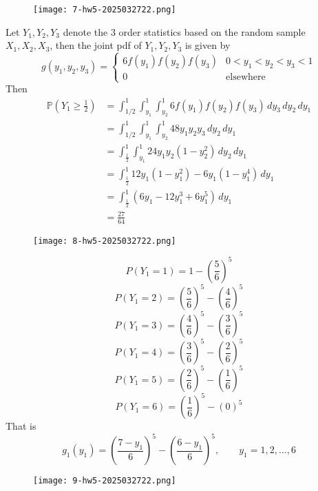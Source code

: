 \begin{exercise}
\begin{figure}[H]
\centering
\texttt{[image: 7-hw5-2025032722.png]}
\label{}
\end{figure}
\end{exercise}
Let $Y_1,Y_2,Y_3$ denote the 3 order statistics based on the random sample $X_1,X_2,X_3$, then the joint pdf of $Y_1,Y_2,Y_3$ is given by
\[
g(y_1,y_2,y_3)=\begin{cases}
6f(y_1)f(y_2)f(y_3) & 0<y_1<y_2<y_3<1 \\
0 & \text{elsewhere}
\end{cases}
\]
Then
\[
\begin{aligned}
\mathbb{P}\left( Y_1\geq \frac{1}{2} \right) & =\int_{1/2 }^{1} \int_{y_1}^{1} \int_{y_2}^{1} 6f(y_1)f(y_2)f(y_3) \, dy_3  \, dy_2  \, dy_1 \\
 & =\int_{1/2 }^{1} \int_{y_1}^{1} \int_{y_2}^{1} 48y_1y_2y_3  \, dy_2  \, dy_1  \\
 & =\int_{\frac{1}{2}}^{1} \int_{y_1}^{1} 24y_1y_2(1-y_2^2) \, dy_2  \, dy_1  \\
 & =\int_{\frac{1}{2}}^{1} 12y_1(1-y_1^2)-6y_1(1-y_1^{4}) \, dy_1 \\
  & =\int_{\frac{1}{2}}^{1} (6y_1-12y_1^3+6y_1^{5}) \, dy_1  \\
 & =\frac{27}{64} 
\end{aligned} 
\]
\begin{exercise}
\begin{figure}[H]
\centering
\texttt{[image: 8-hw5-2025032722.png]}
\label{}
\end{figure}
\end{exercise}
\[
P(Y_1=1)=1-\left( \frac{5}{6} \right)^{5}
\]
\[
P(Y_1=2)=\left( \frac{5}{6} \right)^{5}-\left( \frac{4}{6} \right)^{5}
\]
\[
P(Y_1=3)=\left( \frac{4}{6} \right)^{5}-\left( \frac{3}{6} \right)^{5}
\]
\[
P(Y_1=4)=\left( \frac{3}{6} \right)^{5}-\left( \frac{2}{6} \right)^{5}
\]
\[
P(Y_1=5)=\left( \frac{2}{6} \right)^{5}-\left( \frac{1}{6} \right)^{5}
\]
\[
P(Y_1=6)=\left( \frac{1}{6} \right)^{5}-(0)^{5}
\]
That is
\[
g_1(y_1)=\left( \frac{7-y_1}{6} \right)^{5}-\left( \frac{6-y_1}{6} \right)^{5},\qquad y_1=1,2,\dots,6
\]
\begin{exercise}
\begin{figure}[H]
\centering
\texttt{[image: 9-hw5-2025032722.png]}
\label{}
\end{figure}
\end{exercise}
